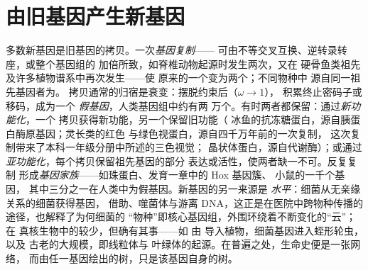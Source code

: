 \section{由旧基因产生新基因}

\begin{definition}\label{def:b3:molecular-evolution:duplication}
多数新基因是旧基因的拷贝。一次\emph{基因复制}——
可由不等交叉互换、逆转录转座，或整个基因组的
加倍所致，如脊椎动物起源时发生两次，又在
硬骨鱼类祖先及许多植物谱系中再次发生——使
原来的一个变为两个；不同物种中
源自同一祖先基因者为。
拷贝通常的归宿是衰变：摆脱约束后（$\omega \to 1$），
积累终止密码子或移码，成为一个
\emph{假基因}，人类基因组中约有两
万个。有时两者都保留：通过\emph{新功能化}，一个
拷贝获得新功能，另一个保留旧功能（
冰鱼的抗冻糖蛋白，源自胰蛋白酶原基因；灵长类的红色
与绿色视蛋白，源自四千万年前的一次复制，
这次复制带来了本科一年级分册中所述的三色视觉；
晶状体蛋白，源自代谢酶）；或通过
\emph{亚功能化}，每个拷贝保留祖先基因的部分
表达或活性，使两者缺一不可。反复复制
形成\emph{基因家族}——如珠蛋白、发育一章中的 Hox 基因簇、
小鼠的一千个基因，
其中三分之一在人类中为假基因。新基因的另一来源是
\emph{水平}：细菌从无亲缘关系的细菌获得基因，
借助、噬菌体与游离 DNA，这正是在医院中跨物种传播的途径，也解释了为何细菌的
“物种”即核心基因组，外围环绕着不断变化的“云”；在
真核生物中的较少，但确有其事——如  由 \emph{}
导入植物，细菌基因进入蛭形轮虫，以及
古老的大规模，即线粒体与
叶绿体的起源。在普遍之处，生命史便是一张网络，
而由任一基因绘出的树，只是该基因自身的树。
\end{definition}

